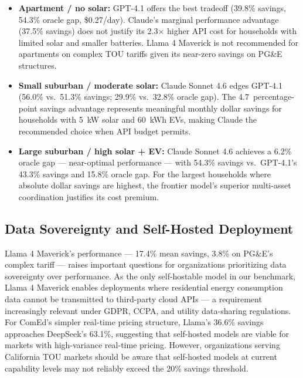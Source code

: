 \documentclass[conference]{IEEEtran}
\begin{document}
\begin{itemize}
  \item \textbf{Apartment / no solar:} GPT-4.1 offers the best tradeoff
    (39.8\% savings, 54.3\% oracle gap, \$0.27/day). Claude's marginal
    performance advantage (37.5\% savings) does not justify its 2.3$\times$
    higher API cost for households with limited solar and smaller batteries.
    Llama 4 Maverick is not recommended for apartments on complex TOU
    tariffs given its near-zero savings on PG\&E structures.

  \item \textbf{Small suburban / moderate solar:} Claude Sonnet 4.6 edges
    GPT-4.1 (56.0\% vs.\ 51.3\% savings; 29.9\% vs.\ 32.8\% oracle gap).
    The 4.7~percentage-point savings advantage represents meaningful
    monthly dollar savings for households with 5~kW solar and 60~kWh EVs,
    making Claude the recommended choice when API budget permits.

  \item \textbf{Large suburban / high solar + EV:} Claude Sonnet 4.6
    achieves a 6.2\% oracle gap --- near-optimal performance --- with
    54.3\% savings vs.\ GPT-4.1's 43.3\% savings and 15.8\% oracle gap.
    For the largest households where absolute dollar savings are highest,
    the frontier model's superior multi-asset coordination justifies
    its cost premium.
\end{itemize}

\subsection{Data Sovereignty and Self-Hosted Deployment}

Llama 4 Maverick's performance --- 17.4\% mean savings, 3.8\% on PG\&E's
complex tariff --- raises important questions for organizations prioritizing
data sovereignty over performance.
As the only self-hostable model in our benchmark, Llama 4 Maverick enables
deployments where residential energy consumption data cannot be transmitted
to third-party cloud APIs --- a requirement increasingly relevant under
GDPR, CCPA, and utility data-sharing regulations.
For ComEd's simpler real-time pricing structure, Llama's 36.6\% savings
approaches DeepSeek's 63.1\%, suggesting that self-hosted models
are viable for markets with high-variance real-time pricing.
However, organizations serving California TOU markets should be aware
that self-hosted models at current capability levels may not reliably
exceed the 20\% savings threshold.
\end{document}
